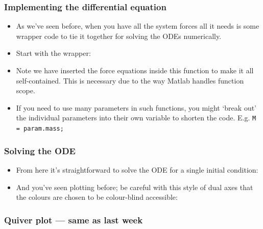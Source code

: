 \documentclass[9pt]{beamer-control}
\begin{document}
\begin{frame}
  \frametitle{Implementing the differential equation}

  \begin{itemize}
    \item As we've seen before, when you have all the system forces all it needs is some wrapper code to tie it together for solving the ODEs numerically.
    \item Start with the wrapper:
  \end{itemize}


  \begin{itemize}
    \item Note we have inserted the force equations inside this function to make it all self-contained. This is necessary due to the way Matlab handles function scope.
    \item If you need to use many parameters in such functions, you might `break out' the individual parameters into their own variable to shorten the code. E.g. \texttt{M = param.mass;}
  \end{itemize}

\end{frame}

\begin{frame}
  \frametitle{Solving the ODE}

  \begin{itemize}
    \item From here it's straightforward to solve the ODE for a single initial condition:
  \end{itemize}


  \begin{itemize}
    \item And you've seen plotting before; be careful with this style of dual axes that the colours are chosen to be colour-blind accessible:
  \end{itemize}


\end{frame}


\begin{frame}
  \frametitle{Quiver plot --- same as last week}



\end{frame}
\end{document}
